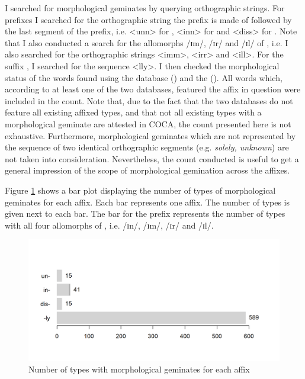 I searched for morphological geminates by querying orthographic strings. For prefixes I searched for the orthographic string the prefix is made of followed by the last segment of the prefix, i.e. <unn> for ,  <inn> for  and  <diss> for . Note that I also conducted a search for the allomorphs /ɪm/, /ɪr/ and /ɪl/ of , i.e. I also searched for the orthographic strings  <imm>, <irr> and <ill>.  For the suffix , I searched for the sequence <lly>.  I then checked the morphological status of the words found using the  database (\citealt{Baayen.1995}) and the  (\citealt{Balota.2007}). All words which, according to at least one of the two databases, featured the affix in question were included in the count. 
Note that, due to the fact that the two databases do not feature all existing affixed types, and that not all existing types with a morphological geminate are attested in COCA, the count presented here is not exhaustive. Furthermore, morphological geminates which are not represented by the sequence of two identical orthographic segments (e.g. \textit{solely, unknown}) are not taken into consideration. Nevertheless, the count conducted is useful to get a general impression of the scope of morphological gemination across the affixes.
 
 Figure \ref{fig:morphological geminates for each affix} shows a bar plot displaying the number of types of morphological geminates for each affix. Each bar represents one affix. The number of types is given next to each bar. The bar for the prefix   represents the number of types with all four allomorphs of , i.e. /ɪn/, /ɪm/, /ɪr/ and /ɪl/. 
 
\begin{figure} [t!]
	\centering
	\includegraphics[scale=0.75]{images/Theory/NumberOfMorphGemAffixes.png}
	\caption{ Number of types with morphological geminates for each affix}
	\label{fig:morphological geminates for each affix}
\end{figure}


